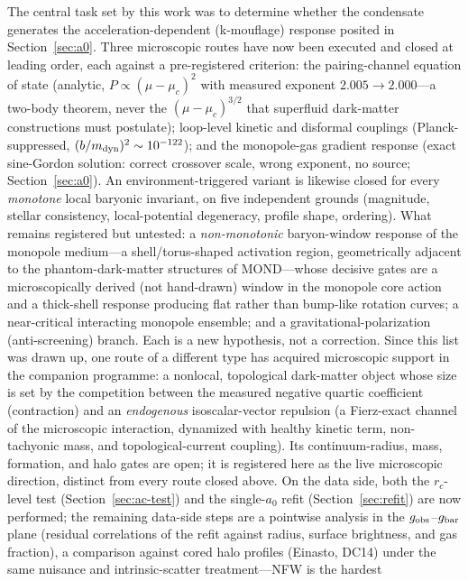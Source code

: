 \documentclass[11pt,a4paper]{article}
\begin{document}
The central task set by this work was to determine whether the
condensate generates the acceleration-dependent (k-mouflage)
response posited in Section~\ref{sec:a0}.  Three microscopic routes
have now been executed and closed at leading order, each against a
pre-registered criterion: the pairing-channel equation of state
(analytic, $P \propto (\mu-\mu_c)^2$ with measured exponent
$2.005 \to 2.000$---a two-body theorem, never the
$(\mu-\mu_c)^{3/2}$ that superfluid dark-matter constructions
\cite{Berezhiani:2015bqa} must postulate); loop-level kinetic and
disformal couplings (Planck-suppressed,
$(b/m_{\rm dyn})^2 \sim 10^{-122}$); and the monopole-gas gradient
response (exact sine-Gordon solution: correct crossover scale,
wrong exponent, no source; Section~\ref{sec:a0}).  An
environment-triggered variant is likewise closed for every
\emph{monotone} local baryonic invariant, on five independent
grounds (magnitude, stellar consistency, local-potential degeneracy,
profile shape, ordering).  What remains registered but untested:
a \emph{non-monotonic} baryon-window response of the monopole
medium---a shell/torus-shaped activation region, geometrically
adjacent to the phantom-dark-matter structures of MOND---whose
decisive gates are a microscopically derived (not hand-drawn) window
in the monopole core action and a thick-shell response producing
flat rather than bump-like rotation curves; a near-critical
interacting monopole ensemble; and a gravitational-polarization
(anti-screening) branch.  Each is a new hypothesis, not a
correction.  Since this list was drawn up, one route of a different
type has acquired microscopic support in the companion programme: a
nonlocal, topological dark-matter object whose size is set by the
competition between the measured negative quartic coefficient
(contraction) and an \emph{endogenous} isoscalar-vector repulsion
(a Fierz-exact channel of the microscopic interaction, dynamized
with healthy kinetic term, non-tachyonic mass, and
topological-current coupling).  Its continuum-radius, mass,
formation, and halo gates are open; it is registered here as the
live microscopic direction, distinct from every route closed
above.
On the data side, both the $r_c$-level test
(Section~\ref{sec:ac-test}) and the single-$a_0$ refit
(Section~\ref{sec:refit}) are now performed; the remaining data-side
steps are a pointwise analysis in the
$g_{\rm obs}$--$g_{\rm bar}$ plane (residual correlations of the
refit against radius, surface brightness, and gas fraction), a
comparison against cored halo profiles (Einasto, DC14) under the
same nuisance and intrinsic-scatter treatment---NFW is the hardest
\end{document}
